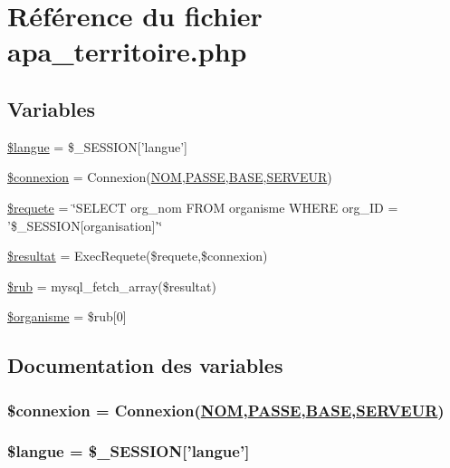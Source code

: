 \hypertarget{apa__territoire_8php}{
\section{R\'{e}f\'{e}rence du fichier apa\_\-territoire.php}
\label{apa__territoire_8php}
}
\subsection*{Variables}
\begin{CompactItemize}
\item 
\hyperlink{apa__territoire_8php_a0}{\$langue} = \$\_\-SESSION\mbox{[}'langue'\mbox{]}
\item 
\hyperlink{apa__territoire_8php_a1}{\$connexion} = Connexion(\hyperlink{pma__connect_8php_a0}{NOM},\hyperlink{pma__connect_8php_a1}{PASSE},\hyperlink{pma__connect_8php_a3}{BASE},\hyperlink{pma__connect_8php_a2}{SERVEUR})
\item 
\hyperlink{apa__territoire_8php_a2}{\$requete} = \char`\"{}SELECT org\_\-nom FROM organisme WHERE org\_\-ID = '\$\_\-SESSION\mbox{[}organisation\mbox{]}'\char`\"{}
\item 
\hyperlink{apa__territoire_8php_a3}{\$resultat} = Exec\-Requete(\$requete,\$connexion)
\item 
\hyperlink{apa__territoire_8php_a4}{\$rub} = mysql\_\-fetch\_\-array(\$resultat)
\item 
\hyperlink{apa__territoire_8php_a5}{\$organisme} = \$rub\mbox{[}0\mbox{]}
\end{CompactItemize}


\subsection{Documentation des variables}
\hypertarget{apa__territoire_8php_a1}{
\subsubsection[\$connexion]{\setlength{\rightskip}{0pt plus 5cm}\$connexion = Connexion(\hyperlink{pma__connect_8php_a0}{NOM},\hyperlink{pma__connect_8php_a1}{PASSE},\hyperlink{pma__connect_8php_a3}{BASE},\hyperlink{pma__connect_8php_a2}{SERVEUR})}}
\label{apa__territoire_8php_a1}


\hypertarget{apa__territoire_8php_a0}{
\subsubsection[\$langue]{\setlength{\rightskip}{0pt plus 5cm}\$langue = \$\_\-SESSION\mbox{[}'langue'\mbox{]}}}
\label{apa__territoire_8php_a0}


